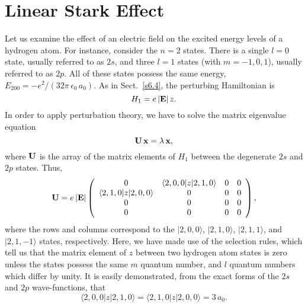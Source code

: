 \section{Linear Stark Effect}\label{s6.6}
Let us examine the effect of an electric field on the excited  energy
levels of a hydrogen atom. For instance, consider the $n=2$ states. 
There is a single $l=0$ state, usually referred to as $2s$, and three $l=1$
states (with $m=-1,0,1$), usually referred to as $2p$. All of these states
possess the same energy, $E_{200} = -e^2/(32\pi\,\epsilon_0 \,a_0)$. As in Sect.~\ref{s6.4}, the
perturbing Hamiltonian is 
\begin{equation}
H_1 = e \,|{\bf E}| \,z.
\end{equation}
In order to apply  perturbation theory, we have to solve
the matrix eigenvalue equation
\begin{equation}
{\bf U} \,{\bf x} = \lambda\,{\bf x},
\end{equation}
where ${\bf U}$ is the array of the matrix elements of $H_1$ between the
degenerate  $2s$ and
$2p$ states. Thus,
\begin{equation}
{\bf U} = e \,|{\bf E}| \left(
\begin{array}{cccc}
0&\langle 2,0,0|z|2,1,0\rangle & 0&0\\
\langle 2,1,0|z|2,0,0\rangle&0&0&0\\
0&0&0&0\\
0&0&0&0
\end{array}\right),
\end{equation}
where the rows and columns correspond to the $|2,0,0\rangle$, $|2,1,0\rangle$,
$|2,1,1\rangle$, and $|2,1,-1\rangle$ states, respectively. Here, we have made use
of the selection rules, which tell us that the matrix element of $z$ between
two hydrogen atom states  is zero unless the states 
possess the same $m$ quantum number, 
and $l$ quantum numbers which differ by unity. It is easily demonstrated,
from the exact forms of the $2s$ and $2p$ wave-functions, that
\begin{equation}
\langle 2,0,0|z|2,1,0\rangle = \langle 2,1,0|z|2,0,0\rangle = 3\,a_0.
\end{equation}

